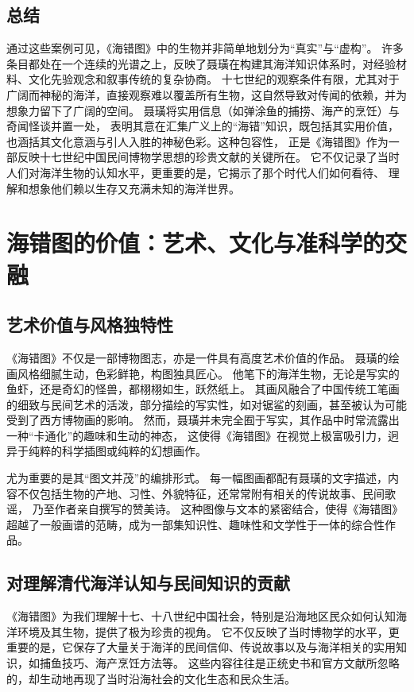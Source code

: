 \documentclass{source/Paper}
\begin{document}
\subsection{总结}
通过这些案例可见，《海错图》中的生物并非简单地划分为“真实”与“虚构”。
许多条目都处在一个连续的光谱之上，反映了聂璜在构建其海洋知识体系时，对经验材料、文化先验观念和叙事传统的复杂协商。
十七世纪的观察条件有限，尤其对于广阔而神秘的海洋，直接观察难以覆盖所有生物，这自然导致对传闻的依赖，并为想象力留下了广阔的空间。
聂璜将实用信息（如弹涂鱼的捕捞、海产的烹饪）与奇闻怪谈并置一处，
表明其意在汇集广义上的“海错”知识，既包括其实用价值，
也涵括其文化意涵与引人入胜的神秘色彩。这种包容性，
正是《海错图》作为一部反映十七世纪中国民间博物学思想的珍贵文献的关键所在。
它不仅记录了当时人们对海洋生物的认知水平，更重要的是，它揭示了那个时代人们如何看待、
理解和想象他们赖以生存又充满未知的海洋世界。
\section{海错图的价值：艺术、文化与准科学的交融}
\subsection{艺术价值与风格独特性}
《海错图》不仅是一部博物图志，亦是一件具有高度艺术价值的作品。
聂璜的绘画风格细腻生动，色彩鲜艳，构图独具匠心。
他笔下的海洋生物，无论是写实的鱼虾，还是奇幻的怪兽，都栩栩如生，跃然纸上。
其画风融合了中国传统工笔画的细致与民间艺术的活泼，部分描绘的写实性，如对锯鲨的刻画，甚至被认为可能受到了西方博物画的影响。
然而，聂璜并未完全囿于写实，其作品中时常流露出一种“卡通化”的趣味和生动的神态，
这使得《海错图》在视觉上极富吸引力，迥异于纯粹的科学插图或纯粹的幻想画作。

尤为重要的是其“图文并茂”的编排形式。
每一幅图画都配有聂璜的文字描述，内容不仅包括生物的产地、习性、外貌特征，还常常附有相关的传说故事、民间歌谣，
乃至作者亲自撰写的赞美诗。
这种图像与文本的紧密结合，使得《海错图》超越了一般画谱的范畴，成为一部集知识性、趣味性和文学性于一体的综合性作品。
\subsection{对理解清代海洋认知与民间知识的贡献}
《海错图》为我们理解十七、十八世纪中国社会，特别是沿海地区民众如何认知海洋环境及其生物，提供了极为珍贵的视角。
它不仅反映了当时博物学的水平，更重要的是，它保存了大量关于海洋的民间信仰、传说故事以及与海洋相关的实用知识，如捕鱼技巧、海产烹饪方法等。
这些内容往往是正统史书和官方文献所忽略的，却生动地再现了当时沿海社会的文化生态和民众生活。
\end{document}
